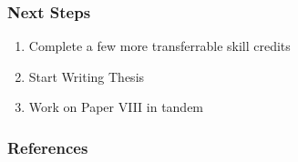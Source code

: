 \documentclass[pdf]{beamer}
\begin{document}
\begin{frame}
    \frametitle{Next Steps}
    \begin{enumerate}
        \item Complete a few more transferrable skill credits
        \item Start Writing Thesis
        \item Work on Paper VIII in tandem 
    \end{enumerate}
    

\end{frame}

\begin{frame}[allowframebreaks]
    \frametitle{References}
    
    
  \end{frame}
\end{document}
